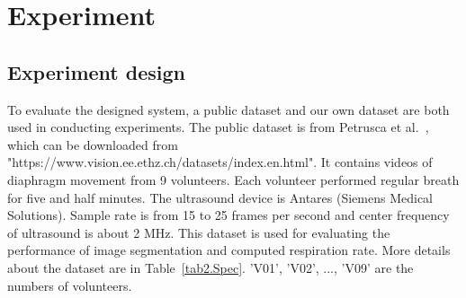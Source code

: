 \section{Experiment} \label{sec.experiment}
\subsection{Experiment design}
To evaluate the designed system, a public dataset and our own dataset are both used in conducting experiments.
The public dataset is from Petrusca et al.~\cite{database}, which can be downloaded from "https://www.vision.ee.ethz.ch/datasets/index.en.html". It contains videos of diaphragm movement from 9 volunteers. Each volunteer performed regular breath for five and half minutes. The ultrasound device is Antares (Siemens Medical Solutions). Sample rate is from 15 to 25 frames per second and center frequency of ultrasound is about 2 MHz. This dataset is used for evaluating the performance of image segmentation and computed respiration rate. More details about the dataset are in Table~\ref{tab2.Spec}. 'V01', 'V02', ..., 'V09' are the numbers of volunteers.


